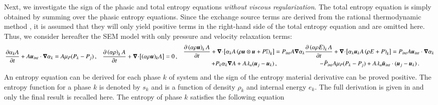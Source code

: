 \documentclass[preprint,10pt]{elsarticle}
\begin{document}
Next, we investigate the sign of the phasic and total entropy equations \emph{without viscous regularization}. The total entropy equation is simply obtained by summing over the phasic entropy equations. Since the exchange source terms are derived from the rational thermodynamic method \cite{BaerNunziato, PassmanNunziato}, it is assumed that they will only yield positive terms in the right-hand side of the total entropy equation and are omitted here. Thus, we consider hereafter the SEM model with only pressure and velocity relaxation terms:
\begin{subequations}\label{eq:liq-7-eqn-sect5_no_exchange}
\begin{align}
  \label{eqn:multi-d-7-eqn-liq-vol_no_exchange}
  \frac{\partial \alpha_{k} A}{\partial t} + A\mbold u_{int} \cdot \grad \alpha_{k}
  &= A \mu_P (P_{k} - P_{j}) \,,
\end{align}
\begin{align}
  \label{multi-d-7-equ-liq_no_exchange}
  \frac{\partial \left( \alpha \rho \right)_{k} A}{\partial t}
  + \div \left[ (\alpha \rho \mbold u)_{k} A \right]
  &= 0 \,,
\end{align}
\begin{multline}
  \frac{\partial \left( \alpha \rho \mbold u \right)_{k} A}{\partial t}
  + \div \left[ \alpha_{k} A \left( \rho \mbold u \otimes \mbold u + P \mathbb{I} \right)_{k} \right]
  = P_{int} A \grad \alpha_{k} \\ + P_{k} \alpha_{k} \grad A
  + A \lambda_u (\mbold u_{j} - \mbold u_{k})\,,
\end{multline}
\begin{multline}
  \frac{\partial \left( \alpha \rho E \right)_{k} A}{\partial t}
  + \div \left[ \alpha_{k} \mbold u_{k} A \left( \rho E + P \right)_{k} \right]
  = P_{int} A \mbold u_{int} \cdot \grad \alpha_{k} \\ - \bar{P}_{int} A \mu_P (P_{k} - P_{j})
  + A \lambda_u \bar{\mbold u}_{int} \cdot (\mbold u_{j} - \mbold u_{k}) \,.
\end{multline}
\end{subequations}
%
An entropy equation can be derived for each phase $k$ of system 
%
and the sign of the entropy material derivative can be proved positive. The entropy function for a phase $k$ is denoted by $s_k$ and is a function of density $\rho_k$ and internal energy $e_k$. The full derivation is given in  and only the final result is recalled here. The entropy of phase $k$ satisfies the following equation
\end{document}
